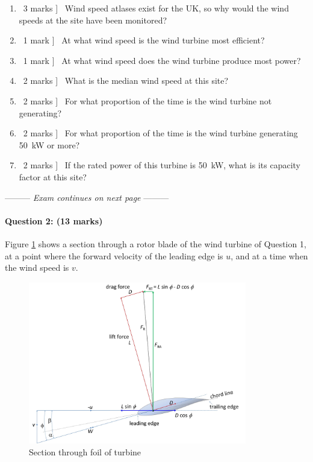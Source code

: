 \documentclass[a4paper,12pt,fleqn]{article}
\newcommand{\middlewords}{Exam continues on next page}
\begin{document}
\begin{enumerate} [resume,label=\alph*)]
\item \lbrack\ 3 marks ] \ Wind speed atlases exist for the UK, so why would the wind speeds at the site have been monitored?
\item \lbrack\ 1 mark ] \ At what wind speed is the wind turbine most efficient?
\item \lbrack\ 1 mark ] \ At what wind speed does the wind turbine produce most power?
\item \lbrack\ 2 marks ] \ What is the median wind speed at this site?
\item \lbrack\ 2 marks ] \ For what proportion of the time is the wind turbine not generating?
\item \lbrack\ 2 marks ] \ For what proportion of the time is the wind turbine generating \SI{50}{\kilo\watt} or more?
\item \lbrack\ 2 marks ] \ If the rated power of this turbine is \SI{50}{\kilo\watt}, what is its capacity factor at this site?
\end{enumerate}

\begin{center}
\vspace{3cm}
--------- \textit{\middlewords} ---------
\end{center}
\newpage

\paragraph{\textbf{Question 2: (13 marks)}}
Figure \ref{figure:q2} shows a section through a rotor blade of the wind turbine of Question 1, at a point where the forward velocity
 of the leading edge is $u$, and at a time when the wind speed is $v$.
\begin{figure}
\centering
\includegraphics[width=0.85\textwidth]{./figures/vectors}
\caption{Section through foil of turbine}
\label{figure:q2}
\end{figure}
\end{document}
